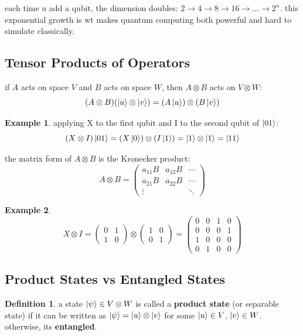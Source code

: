 \documentclass[11pt,a4paper]{article}
\theoremstyle{definition}
\newtheorem{definition}{Definition}[section]
\newtheorem{example}{Example}[section]
\theoremstyle{remark}
\begin{document}
each time u add a qubit, the dimension doubles: $2 \to 4 \to 8 \to 16 \to \ldots \to 2^n$. this exponential growth is wt makes quantum computing both powerful and hard to simulate classically.

\subsection{Tensor Products of Operators}

if $A$ acts on space $V$ and $B$ acts on space $W$, then $A \otimes B$ acts on $V \otimes W$:
\[
(A \otimes B)(\ket{u} \otimes \ket{v}) = (A\ket{u}) \otimes (B\ket{v})
\]

\begin{example}
applying X to the first qubit and I to the second qubit of $\ket{01}$:
\[
(X \otimes I)\ket{01} = (X\ket{0}) \otimes (I\ket{1}) = \ket{1} \otimes \ket{1} = \ket{11}
\]
\end{example}

the matrix form of $A \otimes B$ is the Kronecker product:
\[
A \otimes B = \begin{pmatrix} a_{11}B & a_{12}B & \cdots \\ a_{21}B & a_{22}B & \cdots \\ \vdots & & \ddots \end{pmatrix}
\]

\begin{example}
\[
X \otimes I = \begin{pmatrix} 0 & 1 \\ 1 & 0 \end{pmatrix} \otimes \begin{pmatrix} 1 & 0 \\ 0 & 1 \end{pmatrix} = \begin{pmatrix} 0 & 0 & 1 & 0 \\ 0 & 0 & 0 & 1 \\ 1 & 0 & 0 & 0 \\ 0 & 1 & 0 & 0 \end{pmatrix}
\]
\end{example}

\subsection{Product States vs Entangled States}

\begin{definition}
a state $\ket{\psi} \in V \otimes W$ is called a \textbf{product state} (or separable state) if it can be written as $\ket{\psi} = \ket{u} \otimes \ket{v}$ for some $\ket{u} \in V$, $\ket{v} \in W$. otherwise, its \textbf{entangled}.
\end{definition}
\end{document}
